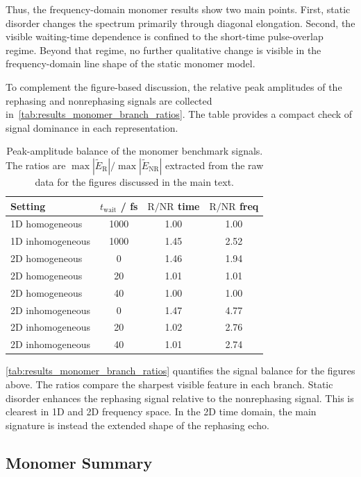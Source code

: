 Thus, the frequency-domain monomer results show two main points. First, static
disorder changes the spectrum primarily through diagonal elongation. Second,
the visible waiting-time dependence is confined to the short-time
pulse-overlap regime. Beyond that regime, no further qualitative change is
visible in the frequency-domain line shape of the static monomer model.

To complement the figure-based discussion, the relative peak amplitudes of the rephasing and nonrephasing signals are collected in~\autoref{tab:results_monomer_branch_ratios}. The table provides a compact check of signal dominance in each representation.
\begin{table}[htbp]
    \centering
    \small
\caption{Peak-amplitude balance of the monomer benchmark signals. The ratios are $\max|\tilde{E}_{\mathrm{R}}|/\max|\tilde{E}_{\mathrm{NR}}|$ extracted from the raw data for the figures discussed in the main text.}
    \label{tab:results_monomer_branch_ratios}
    \begin{tabular}{@{}lccc@{}}
        \toprule
        Setting & $t_{\mathrm{wait}}$ / fs & $\mathrm{R}/\mathrm{NR}$ time & $\mathrm{R}/\mathrm{NR}$ freq \\
        \midrule
        1D homogeneous   & 1000 & 1.00 & 1.00 \\
        1D inhomogeneous & 1000 & 1.45 & 2.52 \\
        2D homogeneous   & 0  & 1.46 & 1.94 \\
        2D homogeneous   & 20 & 1.01 & 1.01 \\
        2D homogeneous   & 40 & 1.00 & 1.00 \\
        2D inhomogeneous & 0  & 1.47 & 4.77 \\
        2D inhomogeneous & 20 & 1.02 & 2.76 \\
        2D inhomogeneous & 40 & 1.01 & 2.74 \\
        \bottomrule
    \end{tabular}
\end{table}

\autoref{tab:results_monomer_branch_ratios} quantifies the signal balance for
the figures above. The ratios compare the sharpest visible feature in each
branch. Static disorder enhances the rephasing signal relative to the
nonrephasing signal. This is clearest in 1D and 2D frequency space. In the 2D
time domain, the main signature is instead the extended shape of the rephasing
echo.

\subsection{Monomer Summary}
\label{subsec:results_monomer_summary}

